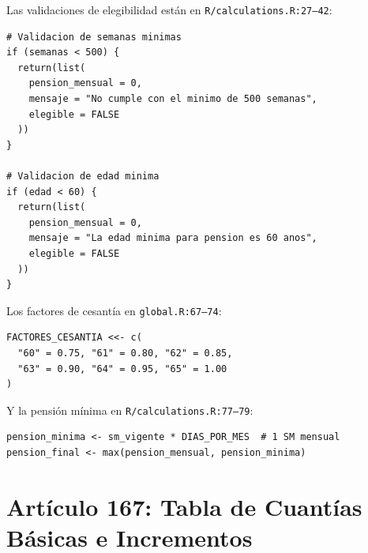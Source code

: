 \documentclass[11pt,a4paper]{report}
\begin{document}
\begin{tcolorbox}[colback=orange!5!white, colframe=orange!75!black, title=\textbf{Aplicaci\'on en C\'odigo}]
Las validaciones de elegibilidad est\'an en \texttt{R/calculations.R:27--42}:

\begin{lstlisting}
# Validacion de semanas minimas
if (semanas < 500) {
  return(list(
    pension_mensual = 0,
    mensaje = "No cumple con el minimo de 500 semanas",
    elegible = FALSE
  ))
}

# Validacion de edad minima
if (edad < 60) {
  return(list(
    pension_mensual = 0,
    mensaje = "La edad minima para pension es 60 anos",
    elegible = FALSE
  ))
}
\end{lstlisting}

Los factores de cesant\'ia en \texttt{global.R:67--74}:
\begin{lstlisting}
FACTORES_CESANTIA <<- c(
  "60" = 0.75, "61" = 0.80, "62" = 0.85,
  "63" = 0.90, "64" = 0.95, "65" = 1.00
)
\end{lstlisting}

Y la pensi\'on m\'inima en \texttt{R/calculations.R:77--79}:
\begin{lstlisting}
pension_minima <- sm_vigente * DIAS_POR_MES  # 1 SM mensual
pension_final <- max(pension_mensual, pension_minima)
\end{lstlisting}
\end{tcolorbox}

\section{Art\'iculo 167: Tabla de Cuant\'ias B\'asicas e Incrementos}
\end{document}
